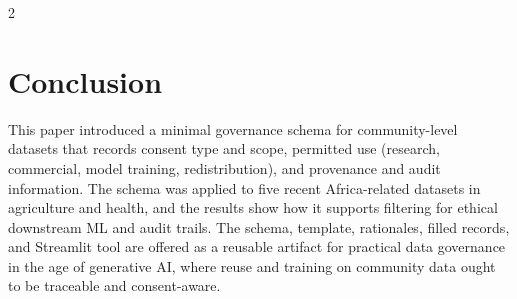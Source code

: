 \documentclass[11pt]{article}
\begin{document}
\begin{multicols}{2}
\section{Conclusion}

This paper introduced a minimal governance schema for community-level datasets that records consent type and scope, permitted use (research, commercial, model training, redistribution), and provenance and audit information. The schema was applied to five recent Africa-related datasets in agriculture and health, and the results show how it supports filtering for ethical downstream ML and audit trails. The schema, template, rationales, filled records, and Streamlit tool are offered as a reusable artifact for practical data governance in the age of generative AI, where reuse and training on community data ought to be traceable and consent-aware.




\end{multicols}
\end{document}
